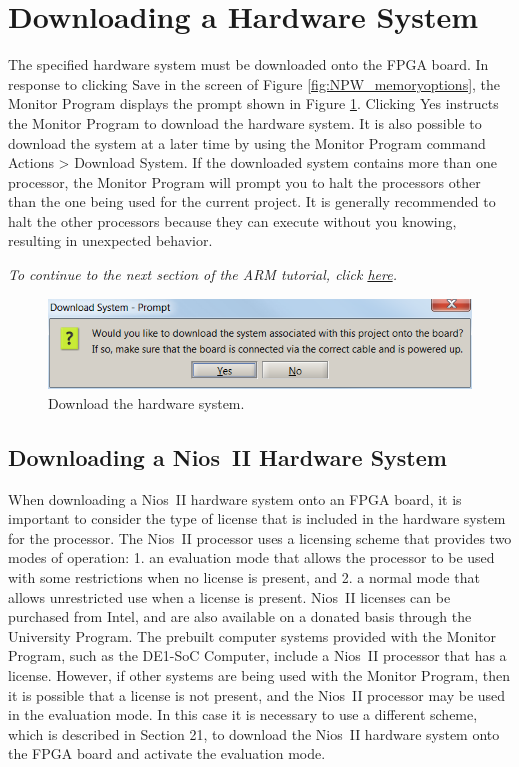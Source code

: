 \documentclass[11pt, twoside, pdftex]{article}
\begin{document}
\clearpage
\newpage
\section{Downloading a Hardware System}
\label{tut:arm_0}

The specified hardware system must be downloaded onto the FPGA
board. In response to clicking {\sf Save} in the screen of 
Figure \ref{fig:NPW_memoryoptions}, the Monitor Program displays the prompt shown in
Figure \ref{fig:NPW_downloadprompt}. Clicking {\sf Yes} instructs the Monitor Program to
download the hardware system. It is also possible to download the
system at a later time by using the Monitor Program command
{\sf Actions > Download System}.
If the downloaded system contains more than one processor,
the Monitor Program will prompt you to halt the processors other
than the one being used for the current project. It is generally
recommended to halt the other processors because they can execute
without you knowing, resulting in unexpected behavior.

{\it To continue to the next section of the ARM tutorial, click \hyperref[tut:arm_1]{here}.}

\begin{figure}[H]
   \begin{center}
      \includegraphics[scale=1]{screenshots/figure13.png}
   \end{center}
   \caption{Download the hardware system.} 
   \label{fig:NPW_downloadprompt}
\end{figure}

\subsection{Downloading a Nios~II Hardware System}
\label{tut:nios_1}

When downloading a Nios~II hardware system onto an FPGA board, 
it is important to consider the type of license that is included
in the hardware system for the processor.
The Nios~II processor uses a licensing scheme that provides two
modes of operation: 1. an evaluation mode that allows the
processor to be used with some restrictions when no
license is present, and 2. a normal mode that allows unrestricted
use when a license is present. Nios~II licenses can be purchased
from Intel, and are also available on a donated basis through
the University Program.  The prebuilt computer systems provided
with the Monitor Program, such as the DE1-SoC Computer, include a
Nios~II processor that has a license. However, if other systems
are being used with the Monitor Program, then it is
possible that a license is not present, and the Nios~II processor
may be used in the evaluation mode. In this case it is necessary
to use a different scheme, which is described in Section 21,
to download the Nios~II hardware system onto the FPGA board and activate the evaluation mode.
\end{document}
